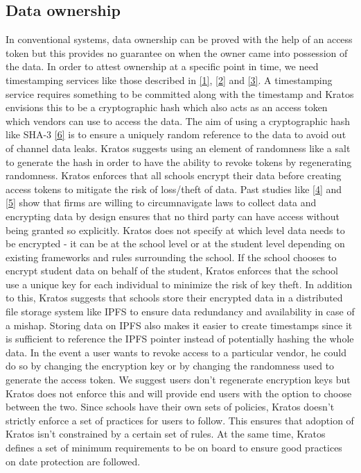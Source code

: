 \documentclass{article}
\begin{document}
\subsection{Data ownership}
In conventional systems, data ownership can be proved with the help of an access token but this provides no guarantee on when the owner came into possession of the data. In order to attest ownership at a specific point in time, we need timestamping services like those described in \hyperref[sec:1]{[1]}, \hyperref[sec:2]{[2]} and \hyperref[sec:3]{[3]}. A timestamping service requires something to be committed along with the timestamp and Kratos envisions this to be a cryptographic hash which also acts as an access token which vendors can use to access the data.
\bigbreak
The aim of using a cryptographic hash like SHA-3 \hyperref[sec:6]{[6]} is to ensure a uniquely random reference to the data to avoid out of channel data leaks. Kratos suggests using an element of randomness like a salt to generate the hash in order to have the ability to revoke tokens by regenerating randomness. Kratos enforces that all schools encrypt their data before creating access tokens to mitigate the risk of loss/theft of data. Past studies like \hyperref[sec:4]{[4]} and \hyperref[sec:5]{[5]} show that firms are willing to circumnavigate laws to collect data and encrypting data by design ensures that no third party can have access without being granted so explicitly.
\bigbreak
Kratos does not specify at which level data needs to be encrypted - it can be at the school level or at the student level depending on existing frameworks and rules surrounding the school. If the school chooses to encrypt student data on behalf of the student, Kratos enforces that the school use a unique key for each individual to minimize the risk of key theft. In addition to this, Kratos suggests that schools store their encrypted data in a distributed file storage system like IPFS to ensure data redundancy and availability in case of a mishap. Storing data on IPFS also makes it easier to create timestamps since it is sufficient to reference the IPFS pointer instead of potentially hashing the whole data.
\bigbreak
In the event a user wants to revoke access to a particular vendor, he could do so by changing the encryption key or by changing the randomness used to generate the access token. We suggest users don't regenerate encryption keys but Kratos does not enforce this and will provide end users with the option to choose between the two.
\bigbreak
Since schools have their own sets of policies, Kratos doesn't strictly enforce a set of practices for users to follow. This ensures that adoption of Kratos isn't constrained by a certain set of rules. At the same time, Kratos defines a set of minimum requirements to be on board to ensure good practices on date protection are followed.
\end{document}
